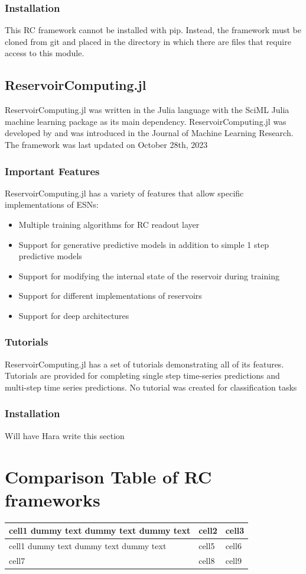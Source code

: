 \documentclass[a4paper,fleqn]{cas-dc}
\begin{document}
\subsubsection{Installation}
This RC framework cannot be installed with pip. Instead, the framework must be cloned from git and placed in the directory in which there are files that require access to this module.  

\subsection{ReservoirComputing.jl}
ReservoirComputing.jl was written in the Julia language with the SciML Julia machine learning package as its main dependency. ReservoirComputing.jl was developed by \cite{JMLR:v23:22-0611} and was introduced in the Journal of Machine Learning Research. The framework was last updated on October 28th, 2023
\subsubsection{Important Features}
ReservoirComputing.jl has a variety of features that allow specific implementations of ESNs:
\begin{itemize}
    \item Multiple training algorithms for RC readout layer
    \item Support for generative predictive models in addition to simple 1 step predictive models
    \item Support for modifying the internal state of the reservoir during training
    \item Support for different implementations of reservoirs
    \item Support for deep architectures
\end{itemize}
\subsubsection{Tutorials}
ReservoirComputing.jl has a set of tutorials demonstrating all of its features. Tutorials are provided for completing single step time-series predictions and multi-step time series predictions. No tutorial was created for classification tasks


\subsubsection{Installation}
Will have Hara write this section 

\section{Comparison Table of RC frameworks}
\begin{center}
\begin{tabular}{ | m{5em} | m{1cm}| m{1cm} | } 
  \hline
  cell1 dummy text dummy text dummy text& cell2 & cell3 \\ 
  \hline
  cell1 dummy text dummy text dummy text & cell5 & cell6 \\ 
  \hline
  cell7 & cell8 & cell9 \\ 
  \hline
\end{tabular}
\end{center}
\end{document}
